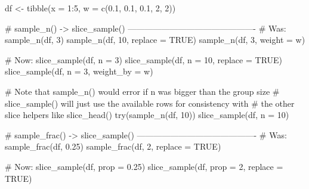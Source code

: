 \documentclass[a4paper]{book}
\begin{document}
%
\begin{Examples}
\begin{ExampleCode}
df <- tibble(x = 1:5, w = c(0.1, 0.1, 0.1, 2, 2))

# sample_n() -> slice_sample() ----------------------------------------------
# Was:
sample_n(df, 3)
sample_n(df, 10, replace = TRUE)
sample_n(df, 3, weight = w)

# Now:
slice_sample(df, n = 3)
slice_sample(df, n = 10, replace = TRUE)
slice_sample(df, n = 3, weight_by = w)

# Note that sample_n() would error if n was bigger than the group size
# slice_sample() will just use the available rows for consistency with
# the other slice helpers like slice_head()
try(sample_n(df, 10))
slice_sample(df, n = 10)

# sample_frac() -> slice_sample() -------------------------------------------
# Was:
sample_frac(df, 0.25)
sample_frac(df, 2, replace = TRUE)

# Now:
slice_sample(df, prop = 0.25)
slice_sample(df, prop = 2, replace = TRUE)
\end{ExampleCode}
\end{Examples}
%
\end{document}
